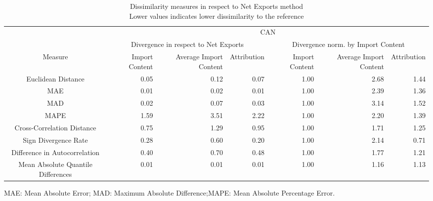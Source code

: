 \begin{table}[t]
\caption*{
{\large Dissimilarity measures in respect to Net Exports method} \\ 
{\small Lower values indicates lower dissimilarity to the reference}
} 
\fontsize{15.0pt}{18.0pt}\selectfont
\begin{tabular*}{\linewidth}{@{\extracolsep{\fill}}crrrrrr}
\toprule
 & \multicolumn{6}{c}{CAN} \\ 
\cmidrule(lr){2-7}
 & \multicolumn{3}{c}{Divergence in respect to Net Exports} & \multicolumn{3}{c}{Divergence norm. by Import Content} \\ 
\cmidrule(lr){2-4} \cmidrule(lr){5-7}
Measure & Import Content & Average Import Content & Attribution & Import Content & Average Import Content & Attribution \\ 
\midrule\addlinespace[2.5pt]
Euclidean Distance & 0.05 & 0.12 & 0.07 & 1.00 & 2.68 & 1.44 \\ 
MAE & 0.01 & 0.02 & 0.01 & 1.00 & 2.39 & 1.36 \\ 
MAD & 0.02 & 0.07 & 0.03 & 1.00 & 3.14 & 1.52 \\ 
MAPE & 1.59 & 3.51 & 2.22 & 1.00 & 2.20 & 1.39 \\ 
Cross-Correlation Distance & 0.75 & 1.29 & 0.95 & 1.00 & 1.71 & 1.25 \\ 
Sign Divergence Rate & 0.28 & 0.60 & 0.20 & 1.00 & 2.14 & 0.71 \\ 
Difference in Autocorrelation & 0.40 & 0.70 & 0.48 & 1.00 & 1.77 & 1.21 \\ 
Mean Absolute Quantile Differences & 0.01 & 0.01 & 0.01 & 1.00 & 1.16 & 1.13 \\ 
\bottomrule
\end{tabular*}
\begin{minipage}{\linewidth}
MAE: Mean Absolute Error; MAD: Maximum Absolute Difference;MAPE: Mean Absolute Percentage Error.\\
\end{minipage}
\end{table}

